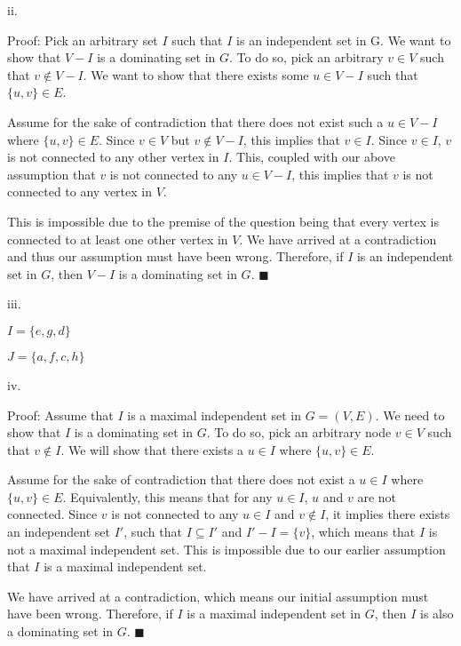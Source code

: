 \documentclass{article}
\renewcommand{\(}{\left(}
\renewcommand{\)}{\right)}
\theoremstyle{plain}
\theoremstyle{plain}
\theoremstyle{definition}
\begin{document}
    ii.
    \begin{shaded}
        Proof: Pick an arbitrary set $I$ such that $I$ is an independent set in G. We want to show that $V-I$ is a dominating set in $G$. To do so, pick an arbitrary $v\in V$ such that $v\notin V-I$. We want to show that there exists some $u\in V-I$ such that $\{u,v\}\in E$.

        \vspace{4mm}

        Assume for the sake of contradiction that there does not exist such a $u\in V-I$ where $\{u,v\}\in E$. Since $v\in V$ but $v\notin V-I$, this implies that $v\in I$. Since $v\in I$, $v$ is not connected to any other vertex in $I$. This, coupled with our above assumption that $v$ is not connected to any $u\in V-I$, this implies that $v$ is not connected to any vertex in $V$.

        \vspace{4mm}

        This is impossible due to the premise of the question being that every vertex is connected to at least one other vertex in $V$. We have arrived at a contradiction and thus our assumption must have been wrong. Therefore, if $I$ is an independent set in $G$, then $V-I$ is a dominating set in $G$. $\blacksquare$
    \end{shaded}
    
    iii.
    \begin{shaded}
        $I=\{e, g, d\}$

        $J=\{a, f, c, h\}$
    \end{shaded}
    
    iv.
    \begin{shaded}
        Proof: Assume that $I$ is a maximal independent set in $G=(V,E)$. We need to show that $I$ is a dominating set in $G$. To do so, pick an arbitrary node $v\in V$ such that $v\notin I$. We will show that there exists a $u\in I$ where $\{u,v\}\in E$.

        \vspace{4mm}

        Assume for the sake of contradiction that there does not exist a $u\in I$ where $\{u,v\}\in E$. Equivalently, this means that for any $u\in I$, $u$ and $v$ are not connected. Since $v$ is not connected to any $u\in I$ and $v\notin I$, it implies there exists an independent set $I'$, such that $I\subseteq I'$ and $I'-I=\{v\}$, which means that $I$ is not a maximal independent set. This is impossible due to our earlier assumption that $I$ is a maximal independent set.

        \vspace{4mm}

        We have arrived at a contradiction, which means our initial assumption must have been wrong. Therefore, if $I$ is a maximal independent set in $G$, then $I$ is also a dominating set in $G$. $\blacksquare$
    \end{shaded}
    
\end{document}
